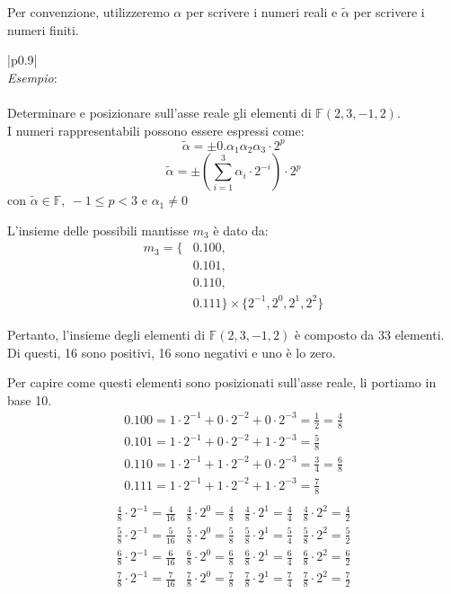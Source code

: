 \documentclass{article}
\newenvironment{example}
{\begin{center}
        \begin{tabular}{|p{0.9\textwidth}|}
            \hline \\ 
            \textit{Esempio}: \\\\ 
        }
        {
            \\\\ \hline
        \end{tabular}
    \end{center}
}
\begin{document}
Per convenzione, utilizzeremo $\alpha$ per scrivere i numeri reali e $\tilde{\alpha}$ per scrivere i numeri finiti.
\begin{example}
    Determinare e posizionare sull'asse reale gli elementi di $\mathbb{F}(2,3,-1,2)$. \\
    I numeri rappresentabili possono essere espressi come:
    $$\tilde\alpha=\pm0.\alpha_1\alpha_2\alpha_3\cdot 2^p$$
    $$\tilde\alpha=\pm(\sum_{i=1}^3\alpha_i\cdot 2^{-i})\cdot 2^p$$
    $\text{con }\tilde\alpha\in \mathbb{F},\ -1\leq p<3 \text{ e }\alpha_1\neq 0$

    L'insieme delle possibili mantisse $m_3$ è dato da:
    $$\begin{aligned}
    m_3 = \{ & 0.100, \\
             & 0.101, \\
             & 0.110, \\
             & 0.111 \} \times \{2^{-1}, 2^{0}, 2^{1}, 2^{2}\}
    \end{aligned}$$
    
    Pertanto, l'insieme degli elementi di $\mathbb{F}(2,3,-1,2)$ è composto da
    33 elementi. Di questi, 16 sono positivi, 16 sono negativi e uno è lo zero.

    Per capire come questi elementi sono posizionati sull'asse reale, li
    portiamo in base 10.
    {
    \renewcommand{\arraystretch}{1.5}
    \[
        \begin{array}{l}
            0.100 = 1\cdot2^{-1}+0\cdot2^{-2}+0\cdot2^{-3}=\frac{1}{2}=\frac{4}{8} \\ 
            0.101 = 1\cdot2^{-1}+0\cdot2^{-2}+1\cdot2^{-3}=\frac{5}{8} \\ 
            0.110 = 1\cdot2^{-1}+1\cdot2^{-2}+0\cdot2^{-3}=\frac{3}{4}=\frac{6}{8} \\ 
            0.111 = 1\cdot2^{-1}+1\cdot2^{-2}+1\cdot2^{-3}=\frac{7}{8} \\ 
        \end{array}
    \]
    \[
        \begin{array}{c|c|c|c}
            \frac{4}{8}\cdot2^{-1}=\frac{4}{16} & \frac{4}{8}\cdot2^{0}=\frac{4}{8} & \frac{4}{8}\cdot2^{1}=\frac{4}{4} & \frac{4}{8}\cdot2^{2}=\frac{4}{2}\\ 
            \frac{5}{8}\cdot2^{-1}=\frac{5}{16} & \frac{5}{8}\cdot2^{0}=\frac{5}{8} & \frac{5}{8}\cdot2^{1}=\frac{5}{4} & \frac{5}{8}\cdot2^{2}=\frac{5}{2}\\ 
            \frac{6}{8}\cdot2^{-1}=\frac{6}{16} & \frac{6}{8}\cdot2^{0}=\frac{6}{8} & \frac{6}{8}\cdot2^{1}=\frac{6}{4} & \frac{6}{8}\cdot2^{2}=\frac{6}{2}\\ 
            \frac{7}{8}\cdot2^{-1}=\frac{7}{16} & \frac{7}{8}\cdot2^{0}=\frac{7}{8} & \frac{7}{8}\cdot2^{1}=\frac{7}{4} & \frac{7}{8}\cdot2^{2}=\frac{7}{2}\\ 
        \end{array}
    \]
    }
    \begin{center}
\end{center}
\end{example}
\end{document}
